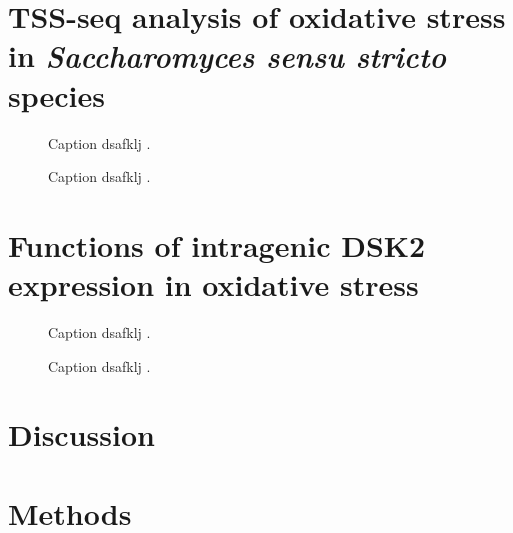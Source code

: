 \section{TSS-seq analysis of oxidative stress in \textit{Saccharomyces sensu stricto} species}

\lipsum[1]

\begin{figure}
\caption[A figure showing TSS-seq coverage over oxidative-stress-induced TSSs in the three species.]{Caption dsafklj .}
\end{figure}

\begin{figure}
\caption[A figure showing TSS-seq coverage over DSK2 in the three species, possibly with the corresponding northern blot.]{Caption dsafklj .}
\end{figure}

\section{Functions of intragenic DSK2 expression in oxidative stress}

\lipsum[1]

\begin{figure}
\caption[A figure showing TSS-seq, TFIIB ChIP-nexus, and MNase-ChIP-seq at DSK2.]{Caption dsafklj .}
\end{figure}

\begin{figure}
\caption[A figure showing DSK2 fitness competition results.]{Caption dsafklj .}
\end{figure}

\section{Discussion}

\lipsum[1]

\section{Methods}

\lipsum[1]

\newpage

\begingroup
\singlespacing

\endgroup

